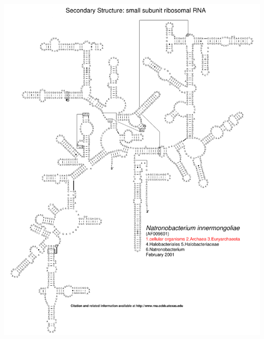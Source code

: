 \documentclass[landscape]{slides}
\begin{document}
\begin{slide}\begin{center}\includegraphics[height=8in]{figs/arc-14}\end{center}\vfill\end{slide}
\end{document}
